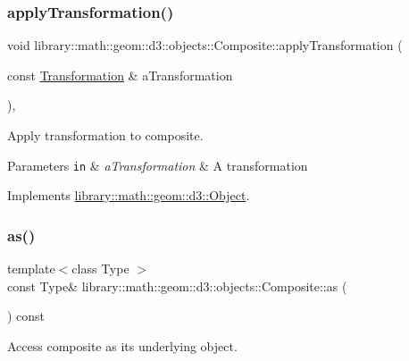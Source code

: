\subsubsection{\texorpdfstring{apply\+Transformation()}{applyTransformation()}}
{\footnotesize\ttfamily void library\+::math\+::geom\+::d3\+::objects\+::\+Composite\+::apply\+Transformation (\begin{DoxyParamCaption}\item[{const \hyperlink{classlibrary_1_1math_1_1geom_1_1d3_1_1_transformation}{Transformation} \&}]{a\+Transformation }\end{DoxyParamCaption})\hspace{0.3cm}{\ttfamily [override]}, {\ttfamily [virtual]}}



Apply transformation to composite. 


\begin{DoxyParams}[1]{Parameters}
\mbox{\tt in}  & {\em a\+Transformation} & A transformation \\
\hline
\end{DoxyParams}


Implements \hyperlink{classlibrary_1_1math_1_1geom_1_1d3_1_1_object_a5fc47b1ee5d9a28efc6010d3d1512470}{library\+::math\+::geom\+::d3\+::\+Object}.

\mbox{\label{classlibrary_1_1math_1_1geom_1_1d3_1_1objects_1_1_composite_ac1cb85e31f4a4380f57f977ec35fca71}} 
\subsubsection{\texorpdfstring{as()}{as()}}
{\footnotesize\ttfamily template$<$class Type $>$ \\
const Type\& library\+::math\+::geom\+::d3\+::objects\+::\+Composite\+::as (\begin{DoxyParamCaption}{ }\end{DoxyParamCaption}) const\hspace{0.3cm}{\ttfamily [inline]}}



Access composite as its underlying object. 

